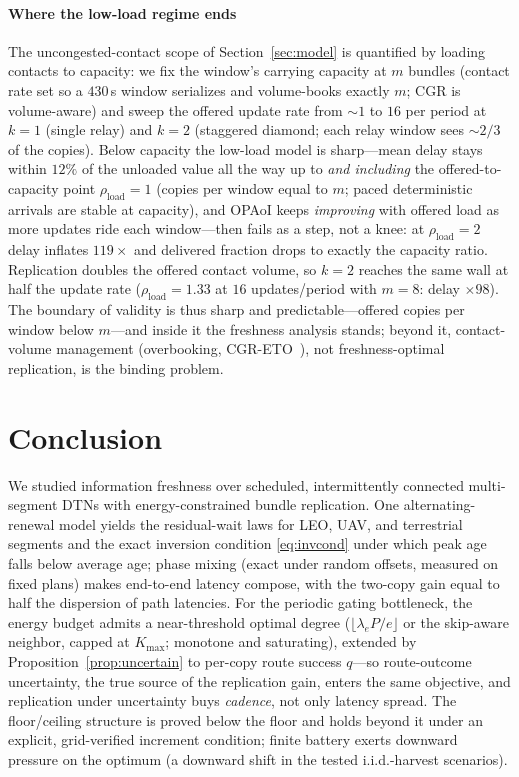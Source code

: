 \documentclass[twocolumn,3p,times,procedia]{elsarticle}
\begin{document}
\paragraph*{Where the low-load regime ends}
The uncongested-contact scope of Section~\ref{sec:model} is quantified
by loading contacts to capacity: we fix the window's carrying capacity
at $m$ bundles (contact rate set so a $430$\,s window serializes and
volume-books exactly $m$; CGR is volume-aware) and sweep the offered
update rate from ${\sim}1$ to $16$ per period at $k{=}1$ (single relay)
and $k{=}2$ (staggered diamond; each relay window sees
${\sim}2/3$ of the copies). Below capacity the low-load model is
sharp---mean delay stays within $12\%$ of the unloaded value all the
way up to \emph{and including} the offered-to-capacity point
$\rho_{\mathrm{load}}{=}1$ (copies per window equal to $m$; paced
deterministic arrivals are stable at capacity), and OPAoI keeps
\emph{improving} with offered load as more updates ride each
window---then fails as a step, not a knee: at $\rho_{\mathrm{load}}{=}2$ delay inflates
$119\times$ and delivered fraction drops to exactly the capacity ratio.
Replication doubles the offered contact volume, so $k{=}2$ reaches the
same wall at half the update rate ($\rho_{\mathrm{load}}{=}1.33$ at $16$ updates/period
with $m{=}8$: delay $\times98$). The boundary of validity is thus sharp
and predictable---offered copies per window below $m$---and inside it
the freshness analysis stands; beyond it, contact-volume management
(overbooking, CGR-ETO~\cite{bezirgiannidis}), not freshness-optimal
replication, is the binding problem.


\FloatBarrier
\section{Conclusion}
We studied information freshness over scheduled, intermittently
connected multi-segment DTNs with energy-constrained bundle
replication. One alternating-renewal model yields the residual-wait
laws for LEO, UAV, and terrestrial segments and the exact inversion
condition \eqref{eq:invcond} under which peak age falls below average
age; phase mixing (exact under random offsets, measured on fixed
plans) makes end-to-end latency compose, with the two-copy gain equal
to half the dispersion of path latencies. For the periodic gating
bottleneck, the energy budget admits a near-threshold optimal degree
($\lfloor\lambda_e P/e\rfloor$ or the skip-aware neighbor, capped at
$K_{\max}$; monotone and saturating), extended by
Proposition~\ref{prop:uncertain} to per-copy route success $q$---so
route-outcome uncertainty, the true source of the replication gain,
enters the same objective, and replication under uncertainty buys
\emph{cadence}, not only latency spread. The floor/ceiling structure is
proved below the floor and holds beyond it under an explicit,
grid-verified increment condition; finite battery exerts downward
pressure on the optimum (a downward shift in the tested i.i.d.-harvest
scenarios).
\end{document}
